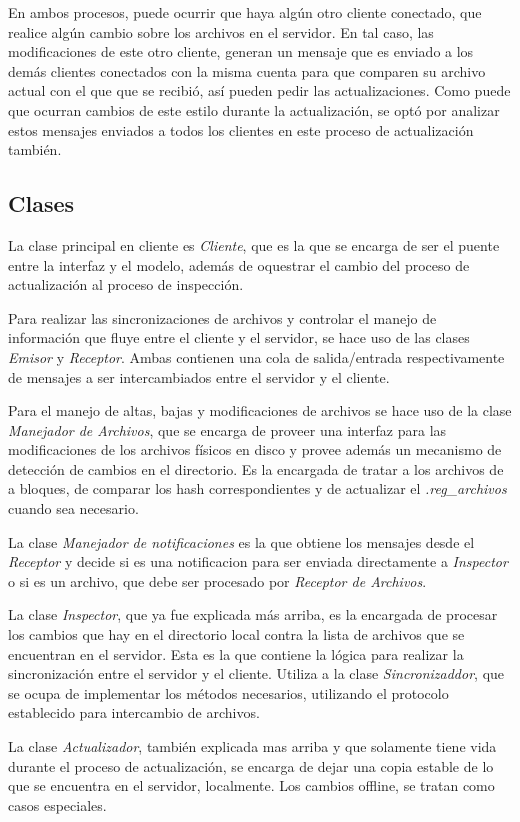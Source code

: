\documentclass{article}
\begin{document}
	\par
	En ambos procesos, puede ocurrir que haya algún otro cliente conectado, que realice algún cambio sobre los archivos en el servidor. En tal caso, las modificaciones de este otro cliente, generan un mensaje que es enviado a los demás clientes conectados con la misma cuenta para que comparen su archivo actual con el que que se recibió, así pueden pedir las actualizaciones. Como puede que ocurran cambios de este estilo durante la actualización, se optó por analizar estos mensajes enviados a todos los clientes en este proceso de actualización también.
\bigskip



\subsection{Clases}

	La clase principal en cliente es \textit{Cliente}, que es la que se encarga de ser el puente entre la interfaz y el modelo, además de oquestrar el cambio del proceso de actualización al proceso de inspección. 
	\par

	Para realizar las sincronizaciones de archivos y controlar el manejo de información que fluye entre el cliente y el servidor, se hace uso de las clases \textit{Emisor} y \textit{Receptor}. Ambas contienen una cola de salida/entrada respectivamente de mensajes a ser intercambiados entre el servidor y el cliente. 
	\par
	Para el manejo de altas, bajas y modificaciones de archivos se hace uso de la clase \textit{Manejador de Archivos}, que se encarga de proveer una interfaz para las modificaciones de los archivos físicos en disco y provee además un mecanismo de detección de cambios en el directorio. Es la encargada de tratar a los archivos de a bloques, de comparar los hash correspondientes y de actualizar el \textit{.reg_archivos} cuando sea necesario. 
	\par
	La clase \textit{Manejador de notificaciones} es la que obtiene los mensajes desde el \textit{Receptor} y decide si es una notificacion para ser enviada directamente a \textit{Inspector} o si es un archivo, que debe ser procesado por \textit{Receptor de Archivos}. 
	\par
	La clase \textit{Inspector}, que ya fue explicada más arriba, es la encargada de procesar los cambios que hay en el directorio local contra la lista de archivos que se encuentran en el servidor. Esta es la que contiene la lógica para realizar la sincronización entre el servidor y el cliente. Utiliza a la clase \textit{Sincronizaddor}, que se ocupa de implementar los métodos necesarios, utilizando el protocolo establecido para intercambio de archivos.
	\par
	La clase \textit{Actualizador}, también explicada mas arriba y que solamente tiene vida durante el proceso de actualización, se encarga de dejar una copia estable de lo que se encuentra en el servidor, localmente. Los cambios offline, se tratan como casos especiales. 
\bigskip
\end{document}

